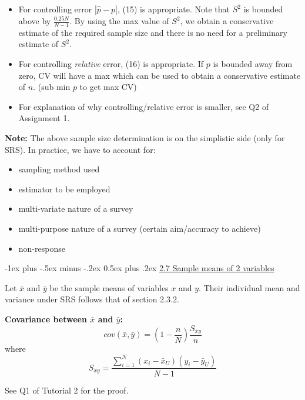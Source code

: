 \documentclass[10pt,landscape]{article}
\makeatletter
\renewcommand{\section}{\@startsection{section}{1}{0mm}%
                                {-1ex plus -.5ex minus -.2ex}%
                                {0.5ex plus .2ex}%
                                {\normalfont\large\bfseries}}
\makeatother
\begin{document}
\begin{multicols}{3}
\begin{itemize}
  \item For controlling error $|\hat{p} - p|$, (15) is appropriate. Note that $S^{2}$ is bounded above by $\frac{0.25N}{N-1}$. By using the max value of $S^{2}$, we obtain a conservative estimate of the required sample size and there is no need for a preliminary estimate of $S^{2}$.
  \item For controlling \textit{relative} error, (16) is appropriate. If $p$ is bounded away from zero, CV will have a max which can be used to obtain a conservative estimate of $n$. (sub min $p$ to get max CV)
  \item For explanation of why controlling/relative error is smaller, see Q2 of Assignment 1.
\end{itemize}

\vspace{10}

\textbf{Note:} The above sample size determination is on the simplistic side (only for SRS). In practice, we have to account for:
\begin{itemize}
  \item sampling method used
  \item estimator to be employed
  \item multi-variate nature of a survey
  \item multi-purpose nature of a survey (certain aim/accuracy to achieve)
  \item non-response
\end{itemize}

\section{\underline{2.7 Sample means of 2 variables}}

Let $\bar{x}$ and $\bar{y}$ be the sample means of variables $x$ and $y$. Their individual mean and variance under SRS follows that of section 2.3.2.

\textbf{Covariance between $\bar{x}$ and $\bar{y}$:}
\begin{equation}
  cov(\bar{x}, \bar{y}) = \left(1-\frac{n}{N}\right)\frac{S_{xy}}{n}
\end{equation}
where
\begin{equation}
  S_{xy} = \frac{\sum^{N}_{i=1}(x_{i}-\bar{x}_{U})(y_{i}-\bar{y}_{U})}{N-1}
\end{equation}

See Q1 of Tutorial 2 for the proof.


\end{multicols}
\end{document}
